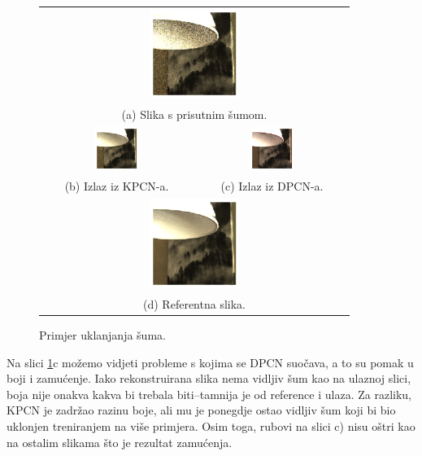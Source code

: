 \documentclass[times, utf8, seminar, numeric]{fer}
\begin{document}
\begin{figure}[H]
  \centering
\begin{tabular}{cc}
  \multicolumn{2}{c}{\includegraphics[width=0.3\textwidth]{eval1_in.png}} \\
  \multicolumn{2}{c}{(a) Slika s prisutnim šumom.} \\[6pt]
  \includegraphics[width=0.3\textwidth]{eval1_kpcn.png} & \includegraphics[width=0.3\textwidth]{eval1_dpcn.png} \\
  (b) Izlaz iz KPCN-a. & (c) Izlaz iz DPCN-a. \\[6pt]
  \multicolumn{2}{c}{\includegraphics[width=0.3\textwidth]{eval1_ref.png}} \\
  \multicolumn{2}{c}{(d) Referentna slika.} \\[6pt]
\end{tabular}
\caption{Primjer uklanjanja šuma.}
\label{fig:eval1}
\end{figure}
Na slici \ref{fig:eval1}c možemo vidjeti probleme s kojima se DPCN suočava, a to su pomak
u boji i zamućenje. Iako rekonstruirana slika nema vidljiv šum kao na ulaznoj slici, boja
nije onakva kakva bi trebala biti--tamnija je od reference i ulaza. Za razliku, KPCN je
zadržao razinu boje, ali mu je ponegdje ostao vidljiv šum koji bi bio uklonjen treniranjem
na više primjera. Osim toga, rubovi na slici c) nisu oštri kao na ostalim slikama što je
rezultat zamućenja.
\end{document}
